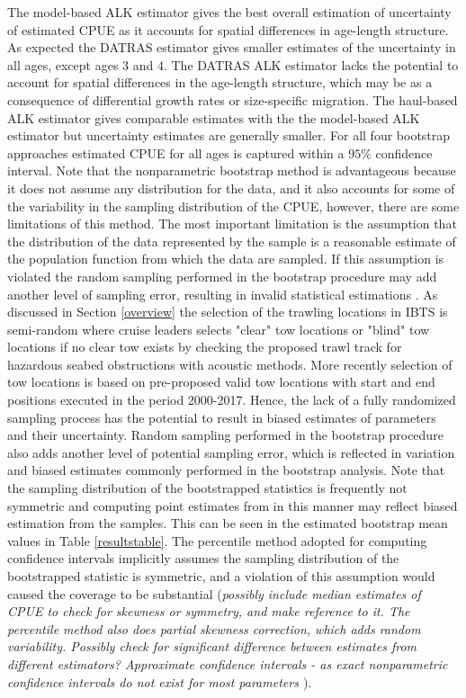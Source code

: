 \documentclass[a4paper 12pt]{article}
\numberwithin{equation}{section}
\begin{document}
The model-based ALK estimator gives the best overall estimation of uncertainty of estimated CPUE as it accounts for spatial differences in age-length structure. As expected the DATRAS estimator gives smaller estimates of the uncertainty in all ages, except ages 3 and 4. The DATRAS ALK estimator lacks the potential to account for spatial differences in the age-length structure, which may be as a consequence of differential growth rates or size-specific migration. The haul-based ALK estimator gives comparable estimates with the the model-based ALK estimator but uncertainty estimates are generally smaller. For all four bootstrap approaches estimated CPUE for all ages is captured within a $95\%$ confidence interval. Note that the nonparametric bootstrap method is advantageous  because it does not assume any distribution for the data, and it also accounts for some of the variability in the sampling distribution of the CPUE, however, there are some limitations of this method. The most important limitation is the assumption that the distribution of the data represented by the sample is a reasonable estimate of the population function from which the data are sampled. If this assumption is violated the random sampling  performed in the bootstrap procedure may add another level of sampling error, resulting in invalid statistical estimations \citep{haukoos2005advanced}. As discussed in Section \ref{overview} the selection of the trawling locations in IBTS is semi-random where cruise leaders selects "clear" tow locations or "blind" tow locations if no clear tow exists by checking the proposed trawl track for hazardous seabed obstructions with acoustic methods. More recently selection of tow locations is based on pre-proposed valid tow locations with start and end positions executed in the period 2000-2017. Hence, the lack of a fully randomized sampling process has the potential to result in biased estimates of parameters and their uncertainty. Random sampling performed in the bootstrap procedure also adds another level of potential sampling error, which is reflected in variation and biased estimates commonly performed in the bootstrap analysis. Note that the sampling distribution of the bootstrapped statistics is frequently not symmetric and computing point estimates from in this manner may reflect biased estimation from the samples. This can be seen in the estimated bootstrap mean values in Table \ref{resultstable}. The percentile method adopted for computing confidence intervals implicitly assumes the sampling distribution of the bootstrapped statistic is symmetric, and a violation of this assumption would caused the coverage to be substantial (\emph{possibly include median estimates of CPUE to check for skewness or symmetry, and make reference to it. The percentile method also does partial skewness correction, which adds random variability. Possibly check for significant difference between estimates from different estimators? Approximate confidence intervals - as exact nonparametric confidence intervals do not exist for most parameters \citep{bahadur1956nonexistence}}). 
\end{document}
